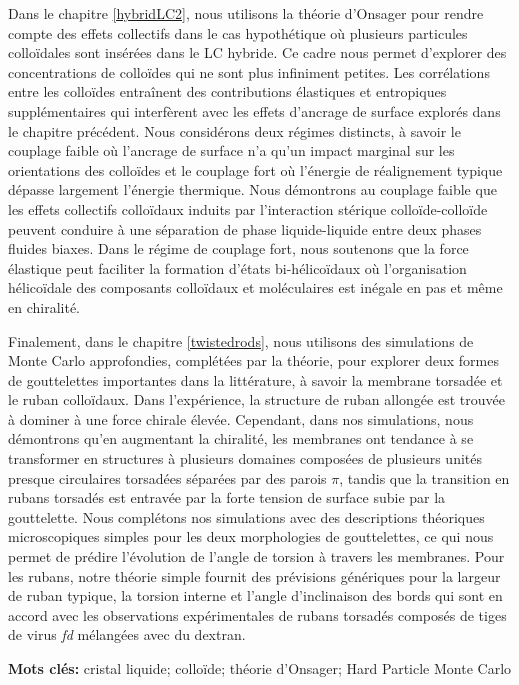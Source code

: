 Dans le chapitre \ref{hybridLC2}, nous utilisons la théorie d'Onsager pour rendre compte des effets collectifs dans le cas hypothétique où plusieurs particules colloïdales sont insérées dans le LC hybride. Ce cadre nous permet d'explorer des concentrations de colloïdes qui ne sont plus infiniment petites. Les corrélations entre les colloïdes entraînent des contributions élastiques et entropiques supplémentaires qui interfèrent avec les effets d'ancrage de surface explorés dans le chapitre précédent. Nous considérons deux régimes distincts, à savoir le couplage faible où l'ancrage de surface n'a qu'un impact marginal sur les orientations des colloïdes et le couplage fort où l'énergie de réalignement typique dépasse largement l'énergie thermique. Nous démontrons au couplage faible que les effets collectifs colloïdaux induits par l'interaction stérique colloïde-colloïde peuvent conduire à une séparation de phase liquide-liquide entre deux phases fluides biaxes. Dans le régime de couplage fort, nous soutenons que la force élastique peut faciliter la formation d'états bi-hélicoïdaux où l'organisation hélicoïdale des composants colloïdaux et moléculaires est inégale en pas et même en chiralité.

Finalement, dans le chapitre \ref{twistedrods}, nous utilisons des simulations de Monte Carlo approfondies, complétées par la théorie, pour explorer deux formes de gouttelettes importantes dans la littérature, à savoir la membrane torsadée et le ruban colloïdaux. Dans l'expérience, la structure de ruban allongée est trouvée à dominer à une force chirale élevée. Cependant, dans nos simulations, nous démontrons qu'en augmentant la chiralité, les membranes ont tendance à se transformer en structures à plusieurs domaines composées de plusieurs unités presque circulaires torsadées séparées par des parois $\pi$, tandis que la transition en rubans torsadés est entravée par la forte tension de surface subie par la gouttelette. Nous complétons nos simulations avec des descriptions théoriques microscopiques simples pour les deux morphologies de gouttelettes, ce qui nous permet de prédire l'évolution de l'angle de torsion à travers les membranes. Pour les rubans, notre théorie simple fournit des prévisions génériques pour la largeur de ruban typique, la torsion interne et l'angle d'inclinaison des bords qui sont en accord avec les observations expérimentales de rubans torsadés composés de tiges de virus {\em fd} mélangées avec du dextran.

{\large\textbf{Mots clés:}} cristal liquide; colloïde; théorie d'Onsager; Hard Particle Monte Carlo